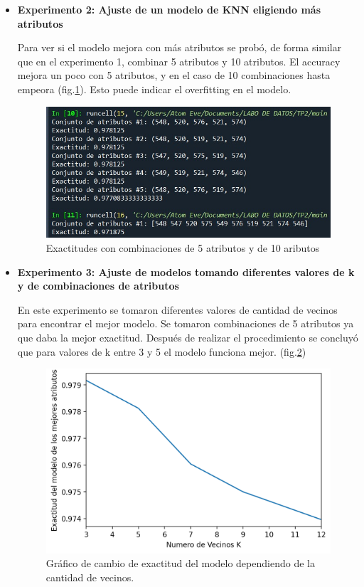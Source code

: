 \documentclass[11pt,a4paper, twocolumn]{article}
\begin{document}
\begin{itemize}
    \item[]
       \textbf{Experimento 2: Ajuste de un modelo de KNN eligiendo más atributos}

Para ver si el modelo mejora con más atributos se probó, de forma similar que en el experimento 1, combinar 5 atributos y 10 atributos.
El accuracy mejora un poco con 5 atributos, y en el caso de 10 combinaciones hasta empeora (fig.\ref{fig:8}). Esto puede indicar el overfitting en el modelo.
\begin{figure}[H]
	\centering
	\includegraphics[scale=0.7]{figuras/2a_2.jpg}
	\caption{Exactitudes con combinaciones de 5 atributos y de 10 aributos}
	\label{fig:8}
\end{figure}
\end{itemize}

\begin{itemize}
    \item []
    \textbf{Experimento 3: Ajuste de modelos tomando diferentes valores de k y de combinaciones de atributos}

En este experimento se tomaron diferentes valores de cantidad de vecinos para encontrar el mejor modelo. Se tomaron combinaciones de 5 atributos ya que daba la mejor exactitud. Después de realizar el procedimiento se concluyó que para valores de k entre 3 y 5 el modelo funciona mejor. (fig.\ref{fig:9})

\begin{figure}[H]
	\centering
	\includegraphics[scale=0.8]{figuras/2e.png}
	\caption{Gráfico de cambio de exactitud del modelo dependiendo de la cantidad de vecinos.}
	\label{fig:9}
\end{figure}

\end{itemize}
\end{document}
